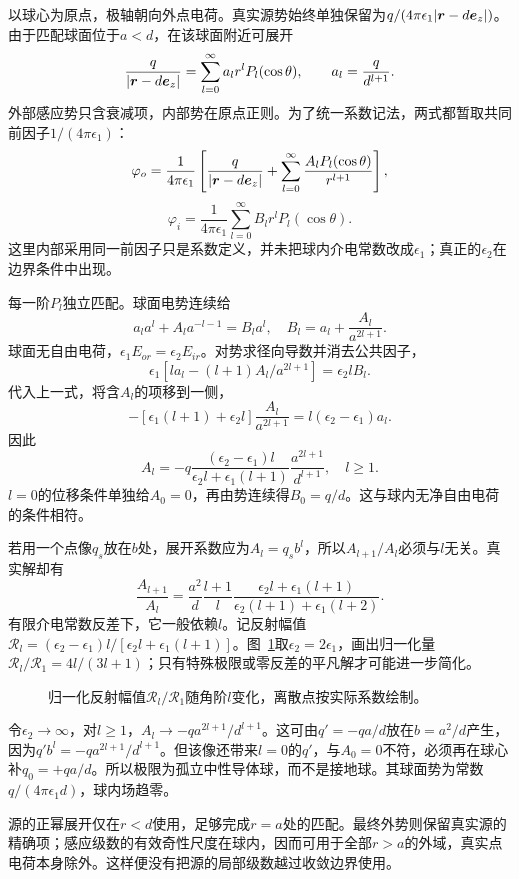\begin{solution}
以球心为原点，极轴朝向外点电荷。真实源势始终单独保留为$q/(4\pi\epsilon_1|\bm{r}-d\bm{e}_z|)$。由于匹配球面位于$a<d$，在该球面附近可展开
\[\frac q{|\bm{r}-d\bm{e}_z|}
=\sum_{l=0}^\infty a_l r^lP_l(\cos\theta),\qquad a_l=\frac q{d^{l+1}}.
\]
外部感应势只含衰减项，内部势在原点正则。为了统一系数记法，两式都暂取共同前因子$1/(4\pi\epsilon_1)$：
\[\varphi_o=\frac1{4\pi\epsilon_1}\left[\frac q{|\bm{r}-d\bm{e}_z|}
+\sum_{l=0}^\infty\frac{A_lP_l(\cos\theta)}{r^{l+1}}\right],
\]
\[\varphi_i=\frac1{4\pi\epsilon_1}\sum_{l=0}^\infty B_lr^lP_l(\cos\theta).
\]
这里内部采用同一前因子只是系数定义，并未把球内介电常数改成$\epsilon_1$；真正的$\epsilon_2$在边界条件中出现。

每一阶$P_l$独立匹配。球面电势连续给
\[a_la^l+A_la^{-l-1}=B_la^l,
\quad B_l=a_l+\frac{A_l}{a^{2l+1}}.
\]
球面无自由电荷，$\epsilon_1E_{or}=\epsilon_2E_{ir}$。对势求径向导数并消去公共因子，
\[\epsilon_1[la_l-(l+1)A_l/a^{2l+1}]=\epsilon_2lB_l.
\]
代入上一式，将含$A_l$的项移到一侧，
\[-[\epsilon_1(l+1)+\epsilon_2l]\frac{A_l}{a^{2l+1}}
=l(\epsilon_2-\epsilon_1)a_l.
\]
因此
\[\boxed{A_l=-q\frac{(\epsilon_2-\epsilon_1)l}{\epsilon_2l+\epsilon_1(l+1)}
\frac{a^{2l+1}}{d^{l+1}}},\quad l\ge1.
\]
$l=0$的位移条件单独给$A_0=0$，再由势连续得$B_0=q/d$。这与球内无净自由电荷的条件相符。

若用一个点像$q_s$放在$b$处，展开系数应为$A_l=q_sb^l$，所以$A_{l+1}/A_l$必须与$l$无关。真实解却有
\[\frac{A_{l+1}}{A_l}=\frac{a^2}{d}\frac{l+1}{l}
\frac{\epsilon_2l+\epsilon_1(l+1)}{\epsilon_2(l+1)+\epsilon_1(l+2)}.
\]
有限介电常数反差下，它一般依赖$l$。记反射幅值$\mathcal R_l=(\epsilon_2-\epsilon_1)l/[\epsilon_2l+\epsilon_1(l+1)]$。图~\ref{fig:es4-e10-s}取$\epsilon_2=2\epsilon_1$，画出归一化量$\mathcal R_l/\mathcal R_1=4l/(3l+1)$；只有特殊极限或零反差的平凡解才可能进一步简化。
\begin{figure}[H]\centering
{}
\caption{归一化反射幅值$\mathcal R_l/\mathcal R_1$随角阶$l$变化，离散点按实际系数绘制。}\label{fig:es4-e10-s}
\end{figure}
令$\epsilon_2\to\infty$，对$l\ge1$，$A_l\to-qa^{2l+1}/d^{l+1}$。这可由$q'=-qa/d$放在$b=a^2/d$产生，因为$q'b^l=-qa^{2l+1}/d^{l+1}$。但该像还带来$l=0$的$q'$，与$A_0=0$不符，必须再在球心补$q_0=+qa/d$。所以极限为孤立中性导体球，而不是接地球。其球面势为常数$q/(4\pi\epsilon_1d)$，球内场趋零。

源的正幂展开仅在$r<d$使用，足够完成$r=a$处的匹配。最终外势则保留真实源的精确项；感应级数的有效奇性尺度在球内，因而可用于全部$r>a$的外域，真实点电荷本身除外。这样便没有把源的局部级数越过收敛边界使用。
\end{solution}


